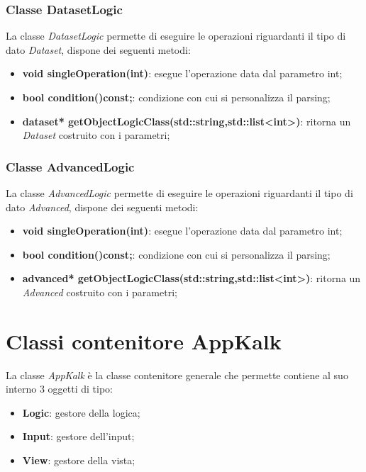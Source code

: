 \documentclass[a4paper,10pt]{article}
\begin{document}
        \subsubsection{Classe DatasetLogic}
        La classe \textit{DatasetLogic} permette di eseguire le operazioni riguardanti il tipo di dato \textit{Dataset}, dispone dei seguenti metodi:
        \begin{itemize}
            \item \textbf{void singleOperation(int)}: esegue l'operazione data dal parametro int;
            \item \textbf{bool condition()const;}: condizione con cui si personalizza il parsing;
            \item \textbf{dataset* getObjectLogicClass(std::string,std::list<int>)}: ritorna un \textit{Dataset} costruito con i parametri;
        \end{itemize}

        \subsubsection{Classe AdvancedLogic}
        La classe \textit{AdvancedLogic} permette di eseguire le operazioni riguardanti il tipo di dato \textit{Advanced}, dispone dei seguenti metodi:
        \begin{itemize}
            \item \textbf{void singleOperation(int)}: esegue l'operazione data dal parametro int;
            \item \textbf{bool condition()const;}: condizione con cui si personalizza il parsing;
            \item \textbf{advanced* getObjectLogicClass(std::string,std::list<int>)}: ritorna un \textit{Advanced} costruito con i parametri;
        \end{itemize}

        \section{Classi contenitore AppKalk}
        La classe \textit{AppKalk} è la classe contenitore generale che permette contiene al suo interno 3 oggetti di tipo:
        \begin{itemize}
            \item \textbf{Logic}: gestore della logica;
            \item \textbf{Input}: gestore dell'input;
            \item \textbf{View}: gestore della vista;
        \end{itemize}
\end{document}
